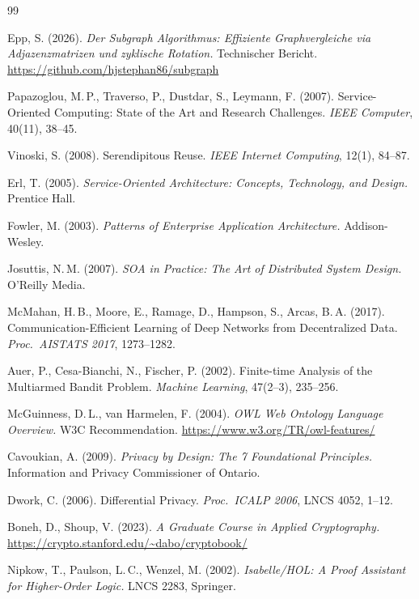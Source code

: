 ﻿\documentclass[a4paper,12pt]{article}
\theoremstyle{definition}
\begin{document}
\begin{thebibliography}{99}

Epp, S. (2026). \textit{Der Subgraph Algorithmus: Effiziente Graphvergleiche via Adjazenzmatrizen und zyklische Rotation.} Technischer Bericht. \url{https://github.com/hjstephan86/subgraph}

Papazoglou, M.\,P., Traverso, P., Dustdar, S., Leymann, F. (2007). Service-Oriented Computing: State of the Art and Research Challenges. \textit{IEEE Computer}, 40(11), 38--45.

Vinoski, S. (2008). Serendipitous Reuse. \textit{IEEE Internet Computing}, 12(1), 84--87.

Erl, T. (2005). \textit{Service-Oriented Architecture: Concepts, Technology, and Design.} Prentice Hall.

Fowler, M. (2003). \textit{Patterns of Enterprise Application Architecture.} Addison-Wesley.

Josuttis, N.\,M. (2007). \textit{SOA in Practice: The Art of Distributed System Design.} O'Reilly Media.

McMahan, H.\,B., Moore, E., Ramage, D., Hampson, S., Arcas, B.\,A. (2017). Communication-Efficient Learning of Deep Networks from Decentralized Data. \textit{Proc.\ AISTATS 2017}, 1273--1282.

Auer, P., Cesa-Bianchi, N., Fischer, P. (2002). Finite-time Analysis of the Multiarmed Bandit Problem. \textit{Machine Learning}, 47(2--3), 235--256.

McGuinness, D.\,L., van Harmelen, F. (2004). \textit{OWL Web Ontology Language Overview.} W3C Recommendation. \url{https://www.w3.org/TR/owl-features/}

Cavoukian, A. (2009). \textit{Privacy by Design: The 7 Foundational Principles.} Information and Privacy Commissioner of Ontario.

Dwork, C. (2006). Differential Privacy. \textit{Proc.\ ICALP 2006}, LNCS 4052, 1--12.

Boneh, D., Shoup, V. (2023). \textit{A Graduate Course in Applied Cryptography.} \url{https://crypto.stanford.edu/~dabo/cryptobook/}

Nipkow, T., Paulson, L.\,C., Wenzel, M. (2002). \textit{Isabelle/HOL: A Proof Assistant for Higher-Order Logic.} LNCS 2283, Springer.


\end{thebibliography}
\end{document}
